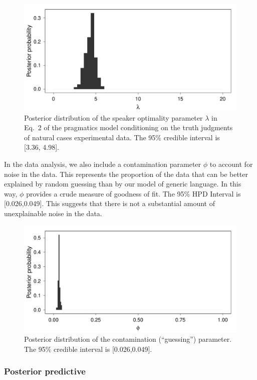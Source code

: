 \documentclass[10pt,letterpaper]{article}
\begin{document}
\begin{figure}
\centering
    \includegraphics[width=0.8\columnwidth]{naturalGenerics-speakerOptimality.pdf}
    \caption{Posterior distribution of the speaker optimality parameter $\lambda$ in Eq.~2 of the pragmatics model conditioning on the truth judgments of natural cases experimental data. The 95\% credible interval is [3.36, 4.98].}
  \label{fig:lambda1}
\end{figure}

In the data analysis, we also include a contamination parameter $\phi$ to account for noise in the data.  
This represents the proportion of the data that can be better explained by random guessing than by our model of generic language.
In this way, $\phi$ provides a crude measure of goodness of fit. 
The 95\% HPD Interval is [0.026,0.049]. 
This suggests that there is not a substantial amount of unexplainable noise in the data. 

\begin{figure}
\centering
    \includegraphics[width=0.8\columnwidth]{naturalGenerics-phi.pdf}
    \caption{Posterior distribution of the contamination (``guessing'') parameter. The 95\% credible interval is [0.026,0.049].}
  \label{fig:phi1}
\end{figure}



\subsubsection{Posterior predictive}
\end{document}
